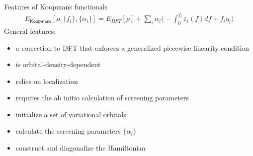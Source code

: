 \documentclass[xcolor=table,aspectratio=169]{beamer}
\numberwithin{equation}{section}
\begin{document}
\begin{frame}{Features of Koopmans functionals}
   \begin{align*}
      E_\mathsf{Koopmans}[\rho,{\{f_i\}}, {\{\alpha_i\}}]
      = {E_{DFT}[\rho]}
      + \sum_i
      {\alpha_i}
      \Biggl(
      -
         {\int^{f_i}_{0} \varepsilon_i(f) df}
      +
         {f_i {\eta_i}}
      \Biggr)
   \end{align*}
   General features:
   \begin{itemize}[<+(1)->]
      \item a correction to DFT that enforces a generalized piecewise linearity condition
      \item is orbital-density-dependent
      \item relies on localization
      \item requires the ab initio calculation of screening parameters
   \end{itemize}
   
   \begin{itemize}[<+(1)->]
      \item initialize a set of variational orbitals
      \item calculate the screening parameters $\{\alpha_i\}$
      \item construct and diagonalize the Hamiltonian
   \end{itemize}
\end{frame}
\end{document}
